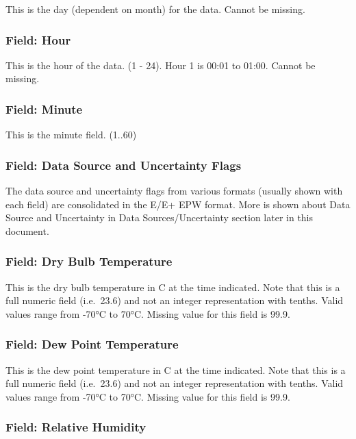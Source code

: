 This is the day (dependent on month) for the data. Cannot be missing.

\subsubsection{Field: Hour}\label{field-hour}

This is the hour of the data. (1 - 24). Hour 1 is 00:01 to 01:00. Cannot be missing.

\subsubsection{Field: Minute}\label{field-minute}

This is the minute field. (1..60)

\subsubsection{Field: Data Source and Uncertainty Flags}\label{field-data-source-and-uncertainty-flags}

The data source and uncertainty flags from various formats (usually shown with each field) are consolidated in the E/E+ EPW format. More is shown about Data Source and Uncertainty in Data Sources/Uncertainty section later in this document.

\subsubsection{Field: Dry Bulb Temperature}\label{field-dry-bulb-temperature}

This is the dry bulb temperature in C at the time indicated. Note that this is a full numeric field (i.e.~23.6) and not an integer representation with tenths. Valid values range from -70°C to 70°C. Missing value for this field is 99.9.

\subsubsection{Field: Dew Point Temperature}\label{field-dew-point-temperature}

This is the dew point temperature in C at the time indicated. Note that this is a full numeric field (i.e.~23.6) and not an integer representation with tenths. Valid values range from -70°C to 70°C. Missing value for this field is 99.9.

\subsubsection{Field: Relative Humidity}\label{field-relative-humidity}

